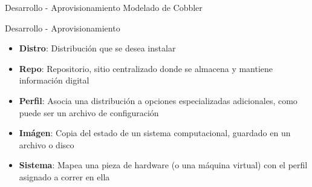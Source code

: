 \begin{frame}{Desarrollo - Aprovisionamiento}
    \vspace{0cm} {Modelado de Cobbler}
    \vspace{0.5cm}
    \begin{figure}[ht]
       \centering
       \vspace{-0.50cm}
    \end{figure}
\end{frame}

\begin{frame}{Desarrollo - Aprovisionamiento}
    \vspace{-1.5cm}
    \begin{itemize}
        \item \textbf{Distro}: Distribución que se desea instalar
        \item \textbf{Repo}: Repositorio, sitio centralizado donde se almacena y mantiene información digital
        \item \textbf{Perfil}: Asocia una distribución a opciones especializadas adicionales, como puede ser un archivo de configuración
        \item \textbf{Imágen}: Copia del estado de un sistema computacional, guardado en un archivo o disco
        \item \textbf{Sistema}: Mapea una pieza de hardware (o una máquina virtual) con el perfil asignado a correr en ella
    \end{itemize}

\end{frame}

